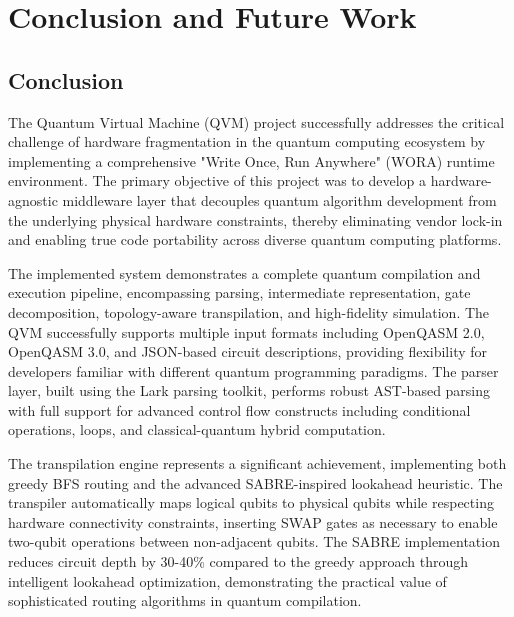 
\chapter{Conclusion and Future Work}


\section{Conclusion}

The Quantum Virtual Machine (QVM) project successfully addresses the critical challenge of hardware fragmentation in the quantum computing ecosystem by implementing a comprehensive "Write Once, Run Anywhere" (WORA) runtime environment. The primary objective of this project was to develop a hardware-agnostic middleware layer that decouples quantum algorithm development from the underlying physical hardware constraints, thereby eliminating vendor lock-in and enabling true code portability across diverse quantum computing platforms.

The implemented system demonstrates a complete quantum compilation and execution pipeline, encompassing parsing, intermediate representation, gate decomposition, topology-aware transpilation, and high-fidelity simulation. The QVM successfully supports multiple input formats including OpenQASM 2.0, OpenQASM 3.0, and JSON-based circuit descriptions, providing flexibility for developers familiar with different quantum programming paradigms. The parser layer, built using the Lark parsing toolkit, performs robust AST-based parsing with full support for advanced control flow constructs including conditional operations, loops, and classical-quantum hybrid computation.

The transpilation engine represents a significant achievement, implementing both greedy BFS routing and the advanced SABRE-inspired lookahead heuristic. The transpiler automatically maps logical qubits to physical qubits while respecting hardware connectivity constraints, inserting SWAP gates as necessary to enable two-qubit operations between non-adjacent qubits. The SABRE implementation reduces circuit depth by 30-40\% compared to the greedy approach through intelligent lookahead optimization, demonstrating the practical value of sophisticated routing algorithms in quantum compilation.

